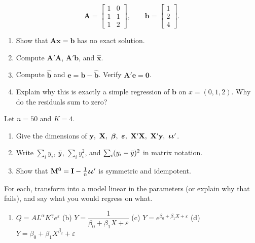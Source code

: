 \documentclass[11pt]{article}
\begin{document}
\[ \mathbf A=\begin{bmatrix}1&0\\1&1\\1&2\end{bmatrix}, \qquad \mathbf b=\begin{bmatrix}1\\2\\4\end{bmatrix}. \]
\begin{enumerate}[label=(\alph*)]
  \item Show that $\mathbf A\mathbf x=\mathbf b$ has no exact solution.
  \item Compute $\mathbf A'\mathbf A$, $\mathbf A'\mathbf b$, and $\hat{\mathbf x}$.
  \item Compute $\hat{\mathbf b}$ and $\mathbf e=\mathbf b-\hat{\mathbf b}$. Verify $\mathbf A'\mathbf e=\mathbf0$.
  \item Explain why this is exactly a simple regression of $\mathbf b$ on $x=(0,1,2)$. Why do the residuals sum to zero?
\end{enumerate}

Let $n=50$ and $K=4$.
\begin{enumerate}[label=(\alph*)]
  \item Give the dimensions of $\by,\ \bX,\ \bb,\ \be,\ \bX'\bX,\ \bX'\by,\ \iotav\iotav'$.
  \item Write $\sum_i y_i$, $\bar{y}$, $\sum_i y_i^2$, and $\sum_i(y_i-\bar{y})^2$ in matrix notation.
  \item Show that $\mathbf{M}^0=\mathbf{I}-\tfrac1n\bm{\iota}\bm{\iota}'$ is symmetric and idempotent.
\end{enumerate}

For each, transform into a model linear in the parameters (or explain why that fails), and say what you would regress on what.
\begin{enumerate}[label=(\alph*)]
  \item $Q=AL^{\alpha}K^{\gamma}e^{\varepsilon}$ \qquad (b) $Y=\dfrac{1}{\beta_0+\beta_1X+\varepsilon}$ \qquad (c) $Y=e^{\beta_0+\beta_1X+\varepsilon}$ \qquad (d) $Y=\beta_0+\beta_1X^{\beta_2}+\varepsilon$
\end{enumerate}
\end{document}
